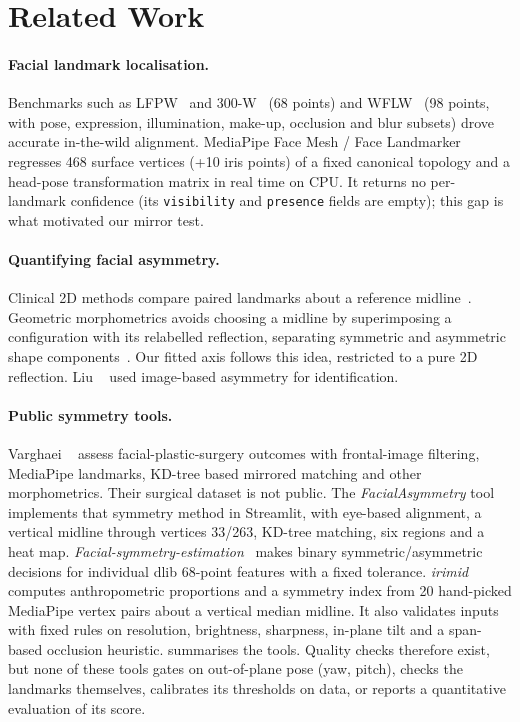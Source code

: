 \section{Related Work}
\label{sec:related}

\paragraph{Facial landmark localisation.}
Benchmarks such as LFPW~\cite{belhumeur2011lfpw} and 300-W~\cite{sagonas2013_300w,
sagonas2016_300w} (68 points) and WFLW~\cite{wu2018lab} (98 points, with pose, expression,
illumination, make-up, occlusion and blur subsets) drove accurate in-the-wild alignment.
MediaPipe Face Mesh / Face Landmarker~\cite{kartynnik2019facemesh,lugaresi2019mediapipe,
mediapipe_facelandmarker} regresses 468 surface vertices (+10 iris points) of a fixed
canonical topology and a head-pose transformation matrix in real time on CPU. It returns
no per-landmark confidence (its \texttt{visibility} and \texttt{presence} fields are empty);
this gap is what motivated our mirror test.

\paragraph{Quantifying facial asymmetry.}
Clinical 2D methods compare paired landmarks about a reference
midline~\cite{berlin2014asymmetry2d}. Geometric morphometrics avoids choosing a midline by
superimposing a configuration with its relabelled reflection, separating symmetric and
asymmetric shape components~\cite{klingenberg2002shape,mardia2000symmetry}. Our fitted axis
follows this idea, restricted to a pure 2D reflection. Liu \etal~\cite{liu2003asymmetry}
used image-based asymmetry for identification.

\paragraph{Public symmetry tools.}
Varghaei \etal~\cite{varghaei2025aesthetic} assess facial-plastic-surgery outcomes with
frontal-image filtering, MediaPipe landmarks, KD-tree based mirrored matching and other
morphometrics. Their surgical dataset is not public. The \textit{FacialAsymmetry}
tool~\cite{nashokan_facialasymmetry} implements that symmetry method in Streamlit, with
eye-based alignment, a vertical midline through vertices 33/263, KD-tree matching, six
regions and a heat map. \textit{Facial-symmetry-estimation}~\cite{yousrajnahi_symmetry}
makes binary symmetric/asymmetric decisions for individual dlib 68-point features with a
fixed tolerance. \textit{irimid}~\cite{irimid} computes anthropometric proportions and a
symmetry index from 20 hand-picked MediaPipe vertex pairs about a vertical median midline.
It also validates inputs with fixed rules on resolution, brightness, sharpness, in-plane
tilt and a span-based occlusion heuristic.  summarises the tools.
Quality checks therefore exist, but none of these tools gates on out-of-plane pose (yaw,
pitch), checks the landmarks themselves, calibrates its thresholds on data, or reports a
quantitative evaluation of its score.

